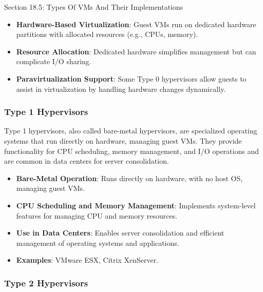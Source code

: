 \begin{notes}{Section 18.5: Types Of VMs And Their Implementations}
    \begin{highlight}
    
        \begin{itemize}
            \item \textbf{Hardware-Based Virtualization}: Guest VMs run on dedicated hardware partitions with allocated resources (e.g., CPUs, memory).
            \item \textbf{Resource Allocation}: Dedicated hardware simplifies management but can complicate I/O sharing.
            \item \textbf{Paravirtualization Support}: Some Type 0 hypervisors allow guests to assist in virtualization by handling hardware changes dynamically.
        \end{itemize}
    
    \end{highlight}
    
    \subsubsection*{Type 1 Hypervisors}
    
    Type 1 hypervisors, also called bare-metal hypervisors, are specialized operating systems that run directly on hardware, managing guest VMs. They provide functionality for CPU scheduling, memory 
    management, and I/O operations and are common in data centers for server consolidation.
    
    \begin{highlight}
    
        \begin{itemize}
            \item \textbf{Bare-Metal Operation}: Runs directly on hardware, with no host OS, managing guest VMs.
            \item \textbf{CPU Scheduling and Memory Management}: Implements system-level features for managing CPU and memory resources.
            \item \textbf{Use in Data Centers}: Enables server consolidation and efficient management of operating systems and applications.
            \item \textbf{Examples}: VMware ESX, Citrix XenServer.
        \end{itemize}
    
    \end{highlight}
    
    \subsubsection*{Type 2 Hypervisors}
    

\end{notes}
